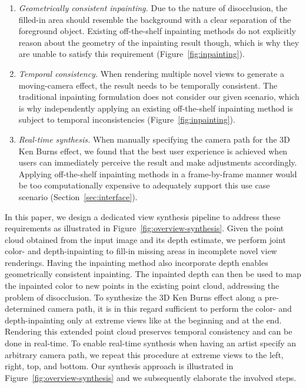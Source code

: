 \documentclass[acmtog,authorversion]{acmart}
\begin{document}
\begin{enumerate}
    \item \textit{Geometrically consistent inpainting.} Due to the nature of disocclusion, the filled-in area should resemble the background with a clear separation of the foreground object. Existing off-the-shelf inpainting methods do not explicitly reason about the geometry of the inpainting result though, which is why they are unable to satisfy this requirement (Figure~\ref{fig:inpainting}).
    \item \textit{Temporal consistency.} When rendering multiple novel views to generate a moving-camera effect, the result needs to be temporally consistent. The traditional inpainting formulation does not consider our given scenario, which is why independently applying an existing off-the-shelf inpainting method is subject to temporal inconsistencies (Figure~\ref{fig:inpainting}).
    \item \textit{Real-time synthesis.} When manually specifying the camera path for the 3D Ken Burns effect, we found that the best user experience is achieved when users can immediately perceive the result and make adjustments accordingly. Applying off-the-shelf inpainting methods in a frame-by-frame manner would be too computationally expensive to adequately support this use case scenario (Section~\ref{sec:interface}).
\end{enumerate}

In this paper, we design a dedicated view synthesis pipeline to address these requirements as illustrated in Figure~\ref{fig:overview-synthesis}. Given the point cloud obtained from the input image and its depth estimate, we perform joint color- and depth-inpainting to fill-in missing areas in incomplete novel view renderings. Having the inpainting method also incorporate depth enables geometrically consistent inpainting. The inpainted depth can then be used to map the inpainted color to new points in the existing point cloud, addressing the problem of disocclusion. To synthesize the 3D Ken Burns effect along a pre-determined camera path, it is in this regard sufficient to perform the color- and depth-inpainting only at extreme views like at the beginning and at the end. Rendering this extended point cloud preserves temporal consistency and can be done in real-time. To enable real-time synthesis when having an artist specify an arbitrary camera path, we repeat this procedure at extreme views to the left, right, top, and bottom. Our synthesis approach is illustrated in Figure~\ref{fig:overview-synthesis} and we subsequently elaborate the involved steps.
\end{document}
